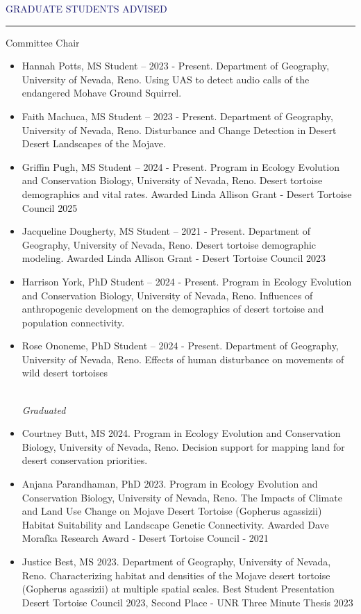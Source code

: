 \documentclass{resume} %
\renewenvironment{rSection}[1]{
\sectionskip
\textcolor{MidnightBlue}{\MakeUppercase{#1}}
\sectionlineskip
\hrule
\begin{list}{}{
\setlength{\leftmargin}{1.5em}
}
\item[]
}{
\end{list}
}
\begin{document}
\begin{rSection}{Graduate Students Advised}

\begin{rSubsection}{Committee Chair}{}{}{}
\begin{itemize}

\item[] Hannah Potts, MS Student – 2023 - Present. Department of Geography, University of Nevada, Reno. Using UAS to detect audio calls of the endangered Mohave Ground Squirrel.
\item[] Faith Machuca, MS Student – 2023 - Present. Department of Geography, University of Nevada, Reno. Disturbance and Change Detection in Desert Desert Landscapes of the Mojave.
\item[] Griffin Pugh, MS Student – 2024 - Present. Program in Ecology Evolution and Conservation Biology, University of Nevada, Reno. Desert tortoise demographics and vital rates. Awarded Linda Allison Grant - Desert Tortoise Council 2025
\item[] Jacqueline Dougherty, MS Student – 2021 - Present. Department of Geography, University of Nevada, Reno. Desert tortoise demographic modeling. Awarded Linda Allison Grant - Desert Tortoise Council 2023
\item[] Harrison York, PhD Student – 2024 - Present. Program in Ecology Evolution and Conservation Biology, University of Nevada, Reno. Influences of anthropogenic development on the demographics of desert tortoise and population connectivity.
\item[] Rose Ononeme, PhD Student – 2024 - Present. Department of Geography, University of Nevada, Reno. Effects of human disturbance on movements of wild desert tortoises

\\
\textit{Graduated}

\item[] Courtney Butt, MS 2024. Program in Ecology Evolution and Conservation Biology, University of Nevada, Reno. Decision support for mapping land for desert conservation priorities.

\item[] Anjana Parandhaman, PhD 2023. Program in Ecology Evolution and Conservation Biology, University of Nevada, Reno. The Impacts of Climate and Land Use Change on Mojave Desert Tortoise (Gopherus agassizii) Habitat Suitability and Landscape Genetic Connectivity. Awarded Dave Morafka Research Award - Desert Tortoise Council - 2021

\item[] Justice Best, MS 2023. Department of Geography, University of Nevada, Reno. Characterizing habitat and densities of the Mojave desert tortoise (Gopherus agassizii) at multiple spatial scales. Best Student Presentation Desert Tortoise Council 2023, Second Place - UNR Three Minute Thesis 2023


\end{itemize}
\end{rSubsection}
\end{rSection}
\end{document}
